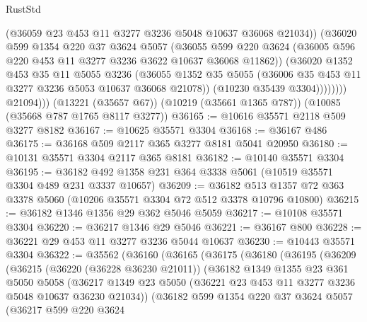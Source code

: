 \begin{lexlean}{RustStd}
\begin{coremodule}
                      (@36059 @23 @453 @11 @3277 @3236 @5048 @10637 @36068 @21034))
                    (@36020
                      @599
                      @1354
                      @220
                      @37
                      @3624
                      @5057
                      (@36055
                        @599
                        @220
                        @3624
                        (@36005 @596 @220 @453 @11 @3277 @3236 @3622 @10637 @36068 @11862))
                      (@36020
                        @1352
                        @453
                        @35
                        @11
                        @5055
                        @3236
                        (@36055
                          @1352
                          @35
                          @5055
                          (@36006 @35 @453 @11 @3277 @3236 @5053 @10637 @36068 @21078))
                        (@10230 @35439 @3304))))))))
          @21094)))
    (@13221 (@35657 @67))
    (@10219 (@35661 @1365 @787))
    (@10085 (@35668 @787 @1765 @8117 @3277))
@36165 := @10616 @35571 @2118 @509 @3277 @8182
@36167 := @10625 @35571 @3304
@36168 := @36167 @486
@36175 := @36168 @509 @2117 @365 @3277 @8181 @5041 @20950
@36180 := @10131 @35571 @3304 @2117 @365 @8181
@36182 := @10140 @35571 @3304
@36195 := @36182 @492 @1358 @231 @364 @3338 @5061 (@10519 @35571 @3304 @489 @231 @3337 @10657)
@36209 := @36182 @513 @1357 @72 @363 @3378 @5060 (@10206 @35571 @3304 @72 @512 @3378 @10796 @10800)
@36215 := @36182 @1346 @1356 @29 @362 @5046 @5059
@36217 := @10108 @35571 @3304
@36220 := @36217 @1346 @29 @5046
@36221 := @36167 @800
@36228 := @36221 @29 @453 @11 @3277 @3236 @5044 @10637
@36230 := @10443 @35571 @3304
@36322 := @35562
    (@36160
      (@36165
        (@36175
          (@36180
            (@36195
              (@36209
                (@36215
                  (@36220 (@36228 @36230 @21011))
                  (@36182
                    @1349
                    @1355
                    @23
                    @361
                    @5050
                    @5058
                    (@36217
                      @1349
                      @23
                      @5050
                      (@36221 @23 @453 @11 @3277 @3236 @5048 @10637 @36230 @21034))
                    (@36182
                      @599
                      @1354
                      @220
                      @37
                      @3624
                      @5057
                      (@36217
                        @599
                        @220
                        @3624

\end{coremodule}
\end{lexlean}

